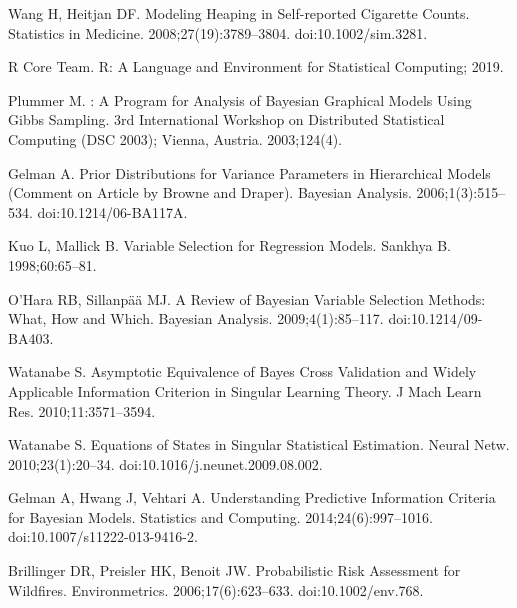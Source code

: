 \documentclass[10pt,letterpaper]{article}
\begin{document}
\begin{thebibliography}{10}
Wang H, Heitjan DF.
\newblock Modeling Heaping in Self-reported Cigarette Counts.
\newblock Statistics in Medicine. 2008;27(19):3789--3804.
\newblock doi:{10.1002/sim.3281}.

{R Core Team}. R: {{A}} Language and Environment for Statistical Computing;
  2019.

Plummer M.
: {{A}} Program for Analysis of {{Bayesian}} Graphical Models
  Using {{Gibbs}} Sampling.
\newblock 3rd International Workshop on Distributed Statistical Computing (DSC
  2003); Vienna, Austria. 2003;124(4).

Gelman A.
\newblock Prior Distributions for Variance Parameters in Hierarchical Models
  (Comment on Article by {{Browne}} and {{Draper}}).
\newblock Bayesian Analysis. 2006;1(3):515--534.
\newblock doi:{10.1214/06-BA117A}.

Kuo L, Mallick B.
\newblock Variable {{Selection}} for {{Regression Models}}.
\newblock Sankhya B. 1998;60:65--81.

O'Hara RB, Sillanp{\"a}{\"a} MJ.
\newblock A Review of {{Bayesian}} Variable Selection Methods: What, How and
  Which.
\newblock Bayesian Analysis. 2009;4(1):85--117.
\newblock doi:{10.1214/09-BA403}.

Watanabe S.
\newblock Asymptotic {{Equivalence}} of {{Bayes Cross Validation}} and {{Widely
  Applicable Information Criterion}} in {{Singular Learning Theory}}.
\newblock J Mach Learn Res. 2010;11:3571--3594.

Watanabe S.
\newblock Equations of {{States}} in {{Singular Statistical Estimation}}.
\newblock Neural Netw. 2010;23(1):20--34.
\newblock doi:{10.1016/j.neunet.2009.08.002}.

Gelman A, Hwang J, Vehtari A.
\newblock Understanding Predictive Information Criteria for {{Bayesian}}
  Models.
\newblock Statistics and Computing. 2014;24(6):997--1016.
\newblock doi:{10.1007/s11222-013-9416-2}.

Brillinger DR, Preisler HK, Benoit JW.
\newblock Probabilistic Risk Assessment for Wildfires.
\newblock Environmetrics. 2006;17(6):623--633.
\newblock doi:{10.1002/env.768}.


\end{thebibliography}
\end{document}
